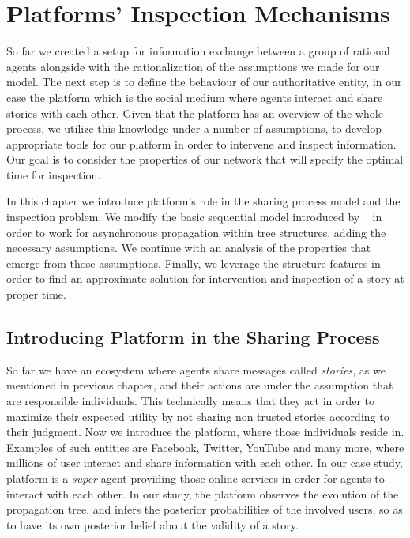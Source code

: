 \chapter{Platforms' Inspection Mechanisms}
\label{ch:Platforms Problem}

So far we created a setup for information exchange between a group of rational agents alongside with the rationalization of the assumptions we made for our model. The next step is to define the behaviour of our authoritative entity, in our case the platform which is the social medium where agents interact and share stories with each other. Given that the platform has an overview of the whole process, we utilize this knowledge under a number of assumptions, to develop appropriate tools for our platform in order to intervene and inspect information. Our goal is to consider the properties of our network that will specify the optimal time for inspection. 

In this chapter we introduce platform's role in the sharing process model and the inspection problem. We modify the basic sequential model introduced by ~\cite{papanastasiou} in order to work for asynchronous propagation within tree structures, adding the necessary assumptions.  We continue with an analysis of the properties that emerge from those assumptions. Finally, we leverage the structure features in order to find an approximate solution for intervention and inspection of a story at proper time. 

\section{Introducing Platform in the Sharing Process}
\label{sec:platformIntro}

So far we have an ecosystem where agents share messages called \textit{stories}, as we mentioned in previous chapter, and their actions are under the assumption that are responsible individuals. This technically means that they act in order to maximize their expected utility by not sharing non trusted stories according to their judgment. Now we introduce the platform, where those individuals reside in. Examples of such entities are Facebook, Twitter, YouTube and many more, where millions of user interact and share information with each other. In our case study, platform is a \textit{super} agent providing those online services in order for agents to interact with each other. In our study, the platform observes the evolution of the propagation tree, and infers the posterior probabilities of the involved users, so as to have its own posterior belief about the validity of a story.

